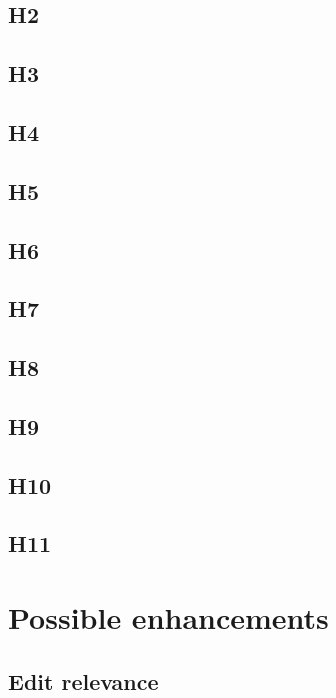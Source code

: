 \subsection*{H2}

\subsection*{H3}

\subsection*{H4}

\subsection*{H5}

\subsection*{H6}

\subsection*{H7}

\subsection*{H8}

\subsection*{H9}

\subsection*{H10}

\subsection*{H11}


\section{Possible enhancements}

\subsection{Edit relevance}

